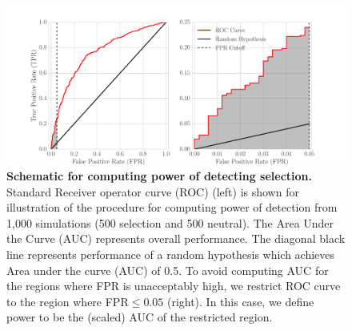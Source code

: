 \begin{figure}[H]
	\centering
	\includegraphics[trim=0.4in 0 .8in 0.02in , 
	clip,width=\textwidth]{figures/powerROC.pdf}
	\caption{{\bf Schematic for computing power of detecting
            selection.}  Standard Receiver operator curve (ROC) (left)
          is shown for illustration of the procedure for computing
          power of detection from 1,000 simulations (500 selection and
          500 neutral). The Area Under the Curve (AUC) represents
          overall performance. The diagonal black line represents
          performance of a random hypothesis which achieves Area under
          the curve (AUC) of 0.5. To avoid computing AUC for the
          regions where FPR is unacceptably high, we restrict ROC
          curve to the region where FPR$\le 0.05$ (right). In this
          case, we define power to be the (scaled) AUC of the
          restricted region.} \label{fig:powerROC}
\end{figure}



